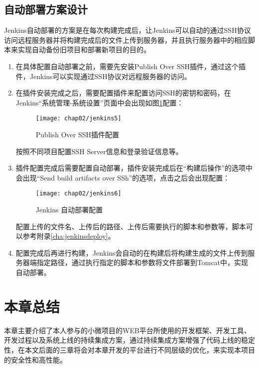\subsection{自动部署方案设计}

Jenkins自动部署的方案是在每次构建完成后，让Jenkins可以自动的通过SSH协议访问远程服务器并将构建完成后的文件上传到服务器，并且执行服务器中的相应脚本来实现自动备份旧项目和部署新项目的目的。

\begin{enumerate}
  \item 在具体配置自动部署之前，需要先安装Publish Over SSH插件，通过这个插件，Jenkins可以实现通过SSH协议对远程服务器的访问。
  \item 在插件安装完成之后，需要配置插件来配置访问SSH的密钥和密码，在Jenkins“系统管理-系统设置”页面中会出现如图\ref{fig:jenkins5}配置：
    \begin{figure}[H] %
      \centering
      \texttt{[image: chap02/jenkins5]}
      \caption{Publish Over SSH插件配置}
      \label{fig:jenkins5}
    \end{figure}
  按照不同项目配置SSH Server信息和登录验证信息等。
  \item 插件配置完成后需要配置自动部署，插件安装完成后在“构建后操作”的选项中会出现“Send build artifacts over SSh”的选项，点击之后会出现配置：
    \begin{figure}[H] %
      \centering
      \texttt{[image: chap02/jenkins6]}
      \caption{Jenkins 自动部署配置}
      \label{fig:jenkins6}
    \end{figure}
  配置上传的文件名、上传后的路径、上传后需要执行的脚本和参数等，脚本可以参考附录\ref{cha:jenkinsdeploy}。
  \item 配置完成后再进行构建，Jenkins会自动的在构建后将构建生成的文件上传到服务器端指定路径，通过执行指定的脚本和参数将文件部署到Tomcat中，实现自动部署。
\end{enumerate}

\section{本章总结}

本章主要介绍了本人参与的小微项目的WEB平台所使用的开发框架、开发工具、开发过程以及系统上线的持续集成方案，通过持续集成方案增强了代码上线的稳定性，在本文后面的三章将会对本章开发的平台进行不同层级的优化，来实现本项目的安全性和高性能。